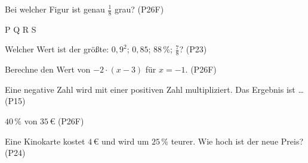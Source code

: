 \documentclass[11pt]{article}
\begin{document}
\small

\begin{aufgabe}{Bei welcher Figur ist genau $\frac{1}{8}$ grau? \hfill (P26F) \\    }

P  \quad Q  \quad R  \quad S 
\end{aufgabe}

\begin{aufgabe}{Welcher Wert ist der größte: $0{,}9^2$; $0{,}85$; $88\,\%$; $\frac{7}{8}$? \hfill (P23) \\ \leerfeld}
\end{aufgabe}

\begin{aufgabe}{Berechne den Wert von $-2 \cdot (x - 3)$ für $x = -1$. \hfill (P26F) \\ \leerfeld}
\end{aufgabe}

\begin{aufgabe}{Eine negative Zahl wird mit einer positiven Zahl multipliziert. Das Ergebnis ist … \hfill (P15) \\   }
\end{aufgabe}

\begin{aufgabe}{$40\,\%$ von $35\,€$ \hfill (P26F) \\ \leerfeld[€]}
\end{aufgabe}

\begin{aufgabe}{Eine Kinokarte kostet $4\,€$ und wird um $25\,\%$ teurer. Wie hoch ist der neue Preis? \hfill (P24) \\ \leerfeld[€]}
\end{aufgabe}
\end{document}
